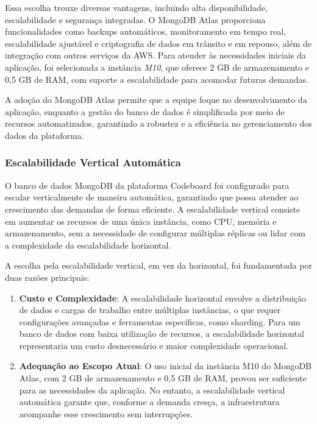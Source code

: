 Essa escolha trouxe diversas vantagens, incluindo alta disponibilidade, escalabilidade e segurança integradas. O MongoDB Atlas proporciona funcionalidades como backups automáticos, monitoramento em tempo real, escalabilidade ajustável e criptografia de dados em trânsito e em repouso, além de integração com outros serviços da AWS. Para atender às necessidades iniciais da aplicação, foi selecionada a instância \emph{M10}, que oferece 2 GB de armazenamento e 0,5 GB de RAM, com suporte a escalabilidade para acomodar futuras demandas.

A adoção do MongoDB Atlas permite que a equipe foque no desenvolvimento da aplicação, enquanto a gestão do banco de dados é simplificada por meio de recursos automatizados, garantindo a robustez e a eficiência no gerenciamento dos dados da plataforma.


\subsubsection{Escalabilidade Vertical Automática}

O banco de dados MongoDB da plataforma Codeboard foi configurado para escalar verticalmente de maneira automática, garantindo que possa atender ao crescimento das demandas de forma eficiente. A escalabilidade vertical consiste em aumentar os recursos de uma única instância, como CPU, memória e armazenamento, sem a necessidade de configurar múltiplas réplicas ou lidar com a complexidade da escalabilidade horizontal.

A escolha pela escalabilidade vertical, em vez da horizontal, foi fundamentada por duas razões principais:
\begin{enumerate}
    \item \textbf{Custo e Complexidade}: A escalabilidade horizontal envolve a distribuição de dados e cargas de trabalho entre múltiplas instâncias, o que requer configurações avançadas e ferramentas específicas, como sharding. Para um banco de dados com baixa utilização de recursos, a escalabilidade horizontal representaria um custo desnecessário e maior complexidade operacional.
    \item \textbf{Adequação ao Escopo Atual}: O uso inicial da instância M10 do MongoDB Atlas, com 2 GB de armazenamento e 0,5 GB de RAM, provou ser suficiente para as necessidades da aplicação. No entanto, a escalabilidade vertical automática garante que, conforme a demanda cresça, a infraestrutura acompanhe esse crescimento sem interrupções.
\end{enumerate}

